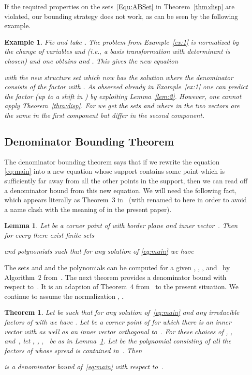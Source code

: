 \documentclass[a4paper]{sig-alternate}
\newtheorem{theorem}{Theorem}
\newtheorem{lemma}{Lemma}
\newtheorem{example}{Example}
\begin{document}
If the required properties on the sets~\eqref{Equ:ABSet} in Theorem~\ref{thm:disp} are violated, our bounding strategy does not work, as can be seen by the following example.

\begin{example}
Fix  and take
. The problem from Example~\ref{ex:1} is normalized
by the change of variables  and  (i.e., a basis transformation \tiny\normalsize with determinant  is chosen) and one obtains  and . This gives the new equation
  
with the new structure set 
which now has the solution  where the denominator consists of the factor  with . As observed already in Example~\ref{ex:1} one can predict the factor  (up to a shift in ) by exploiting Lemma~\ref{lem:2}. However, one cannot apply Theorem~\ref{thm:disp}. For  we get the sets  and  where in  the two vectors are the same in the first component but differ in the second component.
\end{example}

\subsection{Denominator Bounding Theorem}

The denominator bounding theorem says that if we rewrite the equation \eqref{eq:main} into
a new equation whose support contains some point  which is sufficiently far away from
all the other points in the support, then we can read off a denominator bound from this
new equation. We will need the following fact, which appears literally as Theorem~3 in~\cite{kauers10b}
(with  renamed to  here in order to avoid a name clash with the meaning of 
in the present paper).

\begin{lemma}\label{lemma:1}
  Let  be a corner point of  with border plane  and inner vector~.
  Then for every  there exist finite sets
  
  and polynomials  such that for any solution 
  of \eqref{eq:main} we have
  
\end{lemma}

The sets  and  and the polynomials  can be computed for a
given , , , and~ by Algorithm~2 from~\cite{kauers10b}. The next theorem provides
a denominator bound with respect to~. It is an adaption of Theorem~4 from~\cite{kauers10b}
to the present situation. We continue to assume the normalization ,
.

\begin{theorem}\label{thm:db}
  Let  be such that for any solution 
  of~\eqref{eq:main} and any irreducible factors  of  with 
  we have .
  Let  be a corner point of  for which there is an inner vector 
  with  as well as an inner vector  orthogonal to~.
  For these choices of , , and~, let , , ,~ be as in
  Lemma~\ref{lemma:1}.
  Let  be the polynomial consisting of all the factors of 
  whose spread is contained in~.
  Then
  
  is a denominator bound of~\eqref{eq:main} with respect to~.
\end{theorem}
\end{document}
